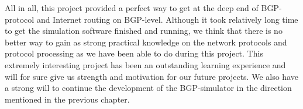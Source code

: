 All in all, this project provided a perfect way to get at the deep end of B\-G\-P-\/protocol and Internet routing on B\-G\-P-\/level. Although it took relatively long time to get the simulation software finished and running, we think that there is no better way to gain as strong practical knowledge on the network protocols and protocol processing as we have been able to do during this project. This extremely interesting project has been an outstanding learning experience and will for sure give us strength and motivation for our future projects. We also have a strong will to continue the development of the B\-G\-P-\/simulator in the direction mentioned in the previous chapter. 
